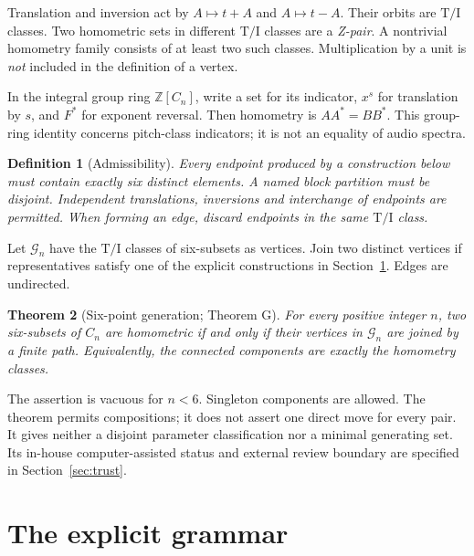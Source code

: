 \documentclass[11pt]{article}
\newtheorem{theorem}{Theorem}[section]
\newtheorem{definition}[theorem]{Definition}
\theoremstyle{remark}
\newcommand{\Z}{\mathbb Z}
\newcommand{\TI}{\mathrm{T/I}}
\begin{document}
Translation and inversion act by $A\mapsto t+A$ and $A\mapsto t-A$.
Their orbits are $\TI$ classes. Two homometric sets in different $\TI$
classes are a \emph{Z-pair}. A nontrivial homometry family consists of at
least two such classes. Multiplication by a unit is \emph{not} included
in the definition of a vertex.

In the integral group ring $\Z[C_n]$, write a set for its indicator,
$x^s$ for translation by $s$, and $F^*$ for exponent reversal. Then
homometry is $AA^*=BB^*$. This group-ring identity concerns pitch-class
indicators; it is not an equality of audio spectra.

\begin{definition}[Admissibility]
Every endpoint produced by a construction below must contain exactly six
distinct elements. A named block partition must be disjoint. Independent
translations, inversions and interchange of endpoints are permitted.
When forming an edge, discard endpoints in the same $\TI$ class.
\end{definition}

Let $\mathcal G_n$ have the $\TI$ classes of six-subsets as vertices.
Join two distinct vertices if representatives satisfy one of the explicit
constructions in Section~\ref{sec:grammar}. Edges are undirected.

\begin{theorem}[Six-point generation; Theorem G]\label{thm:main}
For every positive integer $n$, two six-subsets of $C_n$ are homometric
if and only if their vertices in $\mathcal G_n$ are joined by a finite path.
Equivalently, the connected components are exactly the homometry classes.
\end{theorem}

The assertion is vacuous for $n<6$. Singleton components are allowed.
The theorem permits compositions; it does not assert one direct move for
every pair. It gives neither a disjoint parameter classification nor a
minimal generating set. Its in-house computer-assisted status and external
review boundary are specified in Section~\ref{sec:trust}.

\section{The explicit grammar}\label{sec:grammar}
\end{document}
